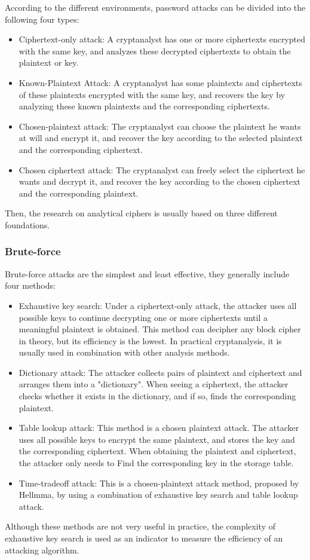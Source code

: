 According to the different environments, password attacks can be divided into the following four types:
\begin{itemize}
    \item Ciphertext-only attack: A cryptanalyst has one or more ciphertexts encrypted with the same key, and analyzes these decrypted ciphertexts to obtain the plaintext or key.
    \item Known-Plaintext Attack: A cryptanalyst has some plaintexts and ciphertexts of these plaintexts encrypted with the same key, and recovers the key by analyzing these known plaintexts and the corresponding ciphertexts.
    \item Chosen-plaintext attack: The cryptanalyst can choose the plaintext he wants at will and encrypt it, and recover the key according to the selected plaintext and the corresponding ciphertext.
    \item Chosen ciphertext attack: The cryptanalyst can freely select the ciphertext he wants and decrypt it, and recover the key according to the chosen ciphertext and the corresponding plaintext.
\end{itemize}Then, the research on analytical ciphers is usually based on three different foundations.

\subsubsection{Brute-force}
Brute-force attacks are the simplest and least effective, they generally include four methods:\begin{itemize}
    \item Exhaustive key search: Under a ciphertext-only attack, the attacker uses all possible keys to continue decrypting one or more ciphertexts until a meaningful plaintext is obtained. This method can decipher any block cipher in theory, but its efficiency is the lowest. In practical cryptanalysis, it is usually used in combination with other analysis methods.
    \item Dictionary attack: The attacker collects pairs of plaintext and ciphertext and arranges them into a "dictionary". When seeing a ciphertext, the attacker checks whether it exists in the dictionary, and if so, finds the corresponding plaintext.
    \item Table lookup attack: This method is a chosen plaintext attack. The attacker uses all possible keys to encrypt the same plaintext, and stores the key and the corresponding ciphertext. When obtaining the plaintext and ciphertext, the attacker only needs to Find the corresponding key in the storage table.
    \item Time-tradeoff attack: This is a chosen-plaintext attack method, proposed by Hellmma, by using a combination of exhaustive key search and table lookup attack.
\end{itemize}Although these methods are not very useful in practice, the complexity of exhaustive key search is used as an indicator to measure the efficiency of an attacking algorithm. 

